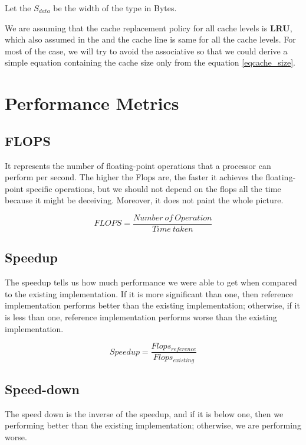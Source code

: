 Let the $S_{data}$ be the width of the type in Bytes.

We are assuming that the cache replacement policy for all cache levels is 
\textbf{LRU}, which also assumed in the \citep{BLIS} and the cache 
line is same for all the cache levels. For most of the case, 
we will try to avoid the associative so that we could derive 
a simple equation containing the cache size only from the equation \ref{eqcache_size}.

\section{Performance Metrics}

\subsection{FLOPS}

It represents the number of floating-point operations that a processor can perform per second. 
The higher the Flops are, the faster it achieves the floating-point specific operations, 
but we should not depend on the flops all the time because it might be deceiving. 
Moreover, it does not paint the whole picture.

\begin{equation}
    FLOPS = \frac{Number\ of\ Operation}{Time\ taken}
    \label{eqflops}
\end{equation}

\subsection{Speedup}

The speedup tells us how much performance we were able to get when compared to 
the existing implementation. If it is more significant than one, 
then reference implementation performs better than the existing implementation; 
otherwise, if it is less than one, reference implementation performs worse 
than the existing implementation.

\begin{equation}
    Speedup = \frac{Flops_{reference}}{Flops_{existing}}
    \label{eq:speedup}
\end{equation}

\subsection{Speed-down}

The speed down is the inverse of the speedup, and if it is below one, 
then we performing better than the existing implementation; 
otherwise, we are performing worse.

